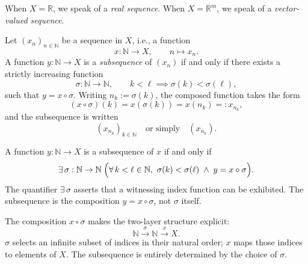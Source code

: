 \begin{remark}
When $X=\mathbb{R}$, we speak of a \emph{real sequence}.
When $X=\mathbb{R}^m$, we speak of a \emph{vector-valued sequence}.
\end{remark}

\begin{tcolorbox}[colback=propbox, colframe=propborder, arc=2pt,
  left=6pt, right=6pt, top=4pt, bottom=4pt,
  title={\small\textbf{Definition (Subsequence)}},
  fonttitle=\small\bfseries]
Let $(x_n)_{n \in \mathbb{N}}$ be a sequence in $X$, i.e., a function
\[
x : \mathbb{N} \to X, \qquad n \mapsto x_n.
\]
A function $y : \mathbb{N} \to X$ is a \emph{subsequence} of $(x_n)$ if and
only if there exists a strictly increasing function
\[
\sigma : \mathbb{N} \to \mathbb{N},
\qquad
k < \ell \implies \sigma(k) < \sigma(\ell),
\]
such that $y = x \circ \sigma$. Writing $n_k := \sigma(k)$, the composed
function takes the form
\[
(x \circ \sigma)(k) = x(\sigma(k)) = x(n_k) =: x_{n_k},
\]
and the subsequence is written
\[
(x_{n_k})_{k \in \mathbb{N}}
\quad\text{or simply}\quad
(x_{n_k}).
\]
\end{tcolorbox}

\begin{remark}
A function $y : \mathbb{N} \to X$ is a subsequence of $x$ if and only if
\[
\exists\, \sigma : \mathbb{N} \to \mathbb{N}
\;\Bigl(
  \forall\, k < \ell \in \mathbb{N},\ \sigma(k) < \sigma(\ell)
  \;\wedge\;
  y = x \circ \sigma
\Bigr).
\]
The quantifier $\exists\,\sigma$ asserts that a witnessing index function
can be exhibited. The subsequence is the composition $y = x \circ \sigma$,
not $\sigma$ itself.
\end{remark}

\begin{remark}
The composition $x \circ \sigma$ makes the two-layer structure explicit:
\[
\mathbb{N}
\xrightarrow{\ \sigma\ }
\mathbb{N}
\xrightarrow{\ x\ }
X.
\]
$\sigma$ selects an infinite subset of indices in their natural order;
$x$ maps those indices to elements of $X$.
The subsequence is entirely determined by the choice of $\sigma$.
\end{remark}

